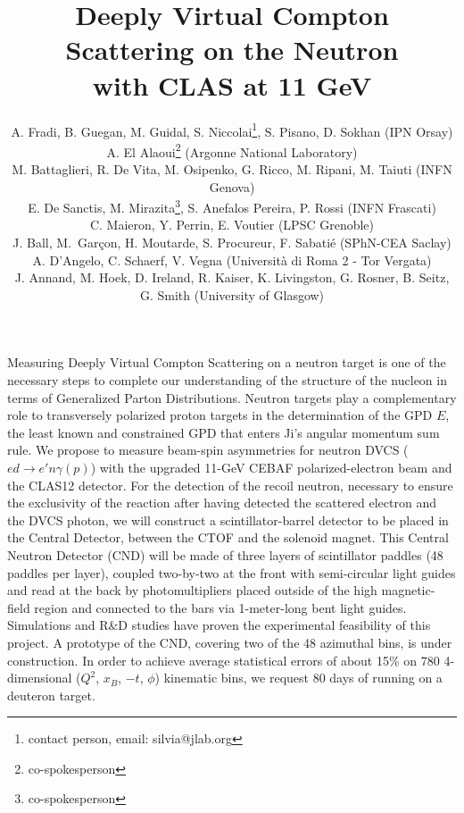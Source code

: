 \documentclass[12pt,oneside]{article}
\begin{document}
\pagestyle{plain}

\title{Deeply Virtual Compton Scattering on the Neutron
\\
 with CLAS at 11 GeV}

\maketitle
\noindent\author{A. Fradi, B. Guegan, M. Guidal, S. Niccolai\footnote{contact person, email: silvia@jlab.org}, S. Pisano, D. Sokhan (IPN Orsay)\\A. El Alaoui\footnote{co-spokesperson} (Argonne National Laboratory)\\M. Battaglieri, R. De Vita, M. Osipenko, G. Ricco, M. Ripani, M. Taiuti (INFN Genova)\\ E. De Sanctis, M. Mirazita\footnote{co-spokesperson}, S. Anefalos Pereira, P. Rossi (INFN Frascati)\\ C. Maieron, Y. Perrin, E. Voutier (LPSC Grenoble)\\  J. Ball, M.~Gar\c con, H. Moutarde, S. Procureur, F. Sabati\'e (SPhN-CEA Saclay) \\ A. D'Angelo, C. Schaerf, V. Vegna (Universit\`a di Roma 2 - Tor Vergata) \\ J. Annand, M. Hoek, D. Ireland, R. Kaiser, K. Livingston, G. Rosner, B. Seitz, G. Smith (University of Glasgow)}
\abstract{}

Measuring Deeply Virtual Compton Scattering on a neutron target is one of the necessary steps to complete our understanding of the structure of the nucleon in terms of Generalized Parton Distributions. Neutron targets play a complementary role to transversely polarized proton targets in the determination of the GPD $E$, the least known and constrained GPD that enters Ji's angular momentum sum rule. We propose to measure beam-spin asymmetries for neutron DVCS ($ed\to e'n\gamma(p)$) with the upgraded 11-GeV CEBAF polarized-electron beam and the CLAS12 detector. For the detection of the recoil neutron, necessary to ensure the exclusivity of the reaction after having detected the scattered electron and the DVCS photon, we will construct a scintillator-barrel detector to be placed in the Central Detector, between the CTOF and the solenoid magnet. This Central Neutron Detector (CND) will be made of three layers of scintillator paddles (48 paddles per layer), coupled two-by-two at the front with semi-circular light guides and read at the back by photomultipliers placed outside of the high magnetic-field region and connected to the bars via 1-meter-long bent light guides. Simulations and R\&D studies have proven the experimental feasibility of this project. A prototype of the CND, covering two of the 48 azimuthal bins, is under construction. In order to achieve average statistical errors of about 15\% on 780 4-dimensional ($Q^2$, $x_B$, $-t$, $\phi$) kinematic bins, we request 80 days of running on a deuteron target. 
\end{document}
